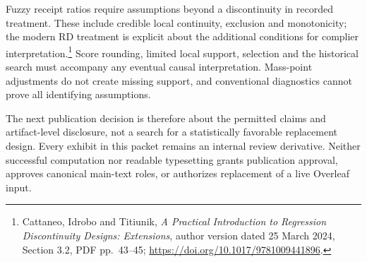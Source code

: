 Fuzzy receipt ratios require assumptions beyond a discontinuity in recorded
treatment. These include credible local continuity, exclusion and
monotonicity; the modern RD treatment is explicit about the additional
conditions for complier interpretation.\footnote{Cattaneo, Idrobo and
Titiunik, \emph{A Practical Introduction to Regression Discontinuity Designs:
Extensions}, author version dated 25 March 2024, Section 3.2, PDF pp.\ 43--45;
\url{https://doi.org/10.1017/9781009441896}.}
Score rounding, limited local support, selection and the historical search
must accompany any eventual causal interpretation. Mass-point adjustments
do not create missing support, and conventional diagnostics cannot prove
all identifying assumptions.

The next publication decision is therefore about the permitted claims and
artifact-level disclosure, not a search for a statistically favorable
replacement design. Every exhibit in this packet remains an internal review
derivative. Neither successful computation nor readable typesetting grants
publication approval, approves canonical main-text roles, or authorizes
replacement of a live Overleaf input.

